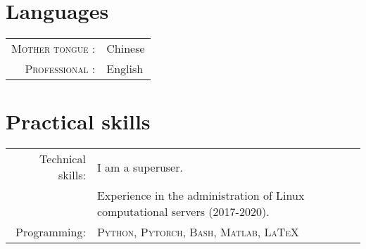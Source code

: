 \documentclass[a4paper,10pt]{article}
\begin{document}
\begin{bibunit}
  \renewcommand\refname{Recent Publications (See more at \href{https://scholar.google.com/citations?hl=en&user=eK9LoQMAAAAJ&view_op=list_works&sortby=pubdate}{my Scholar})}
  \nocite{
    liu2020region,
    liu2020alpha,
    zuxing2020cdc,
    anubhad2020,
    andrea2020,
    liu2020powering,
    honore2020hidden,
    liu2020neural,
    chatterjee2019ssfn,
    liu2019discontinuous,
    liu2019entropy,
    liu2019alpha,
    liu2019dominant,
    liu2018will}
  \footnotesize{\putbib[../bibfile]}
\end{bibunit}


\vspace{-10pt}

\section{Languages}

\begin{tabular}{rp{10cm}}

  \textsc{Mother tongue :} & Chinese \\

  \textsc{Professional :} & English \\

\end{tabular}


\section{Practical skills}

\begin{tabular}{rp{12cm}}
	Technical skills:  & I am a superuser. \\
                     & Experience in the administration of Linux computational servers (2017-2020).
                       \vspace{5pt}\\
	Programming:       & \textsc{Python, Pytorch, Bash, Matlab, \LaTeX}  \vspace{5pt}\\
\end{tabular}
\end{document}
